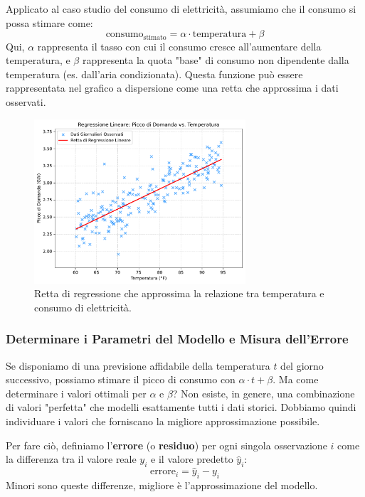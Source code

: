 \documentclass{article}
\begin{document}
Applicato al caso studio del consumo di elettricità, assumiamo che il consumo si possa stimare come:
$$ \text{consumo}_{\text{stimato}} = \alpha \cdot \text{temperatura} + \beta $$
Qui, $\alpha$ rappresenta il tasso con cui il consumo cresce all'aumentare della temperatura, e $\beta$ rappresenta la quota "base" di consumo non dipendente dalla temperatura (es. dall'aria condizionata).  Questa funzione può essere rappresentata nel grafico a dispersione come una retta che approssima i dati osservati.

\begin{figure}[H]
    \centering
    \includegraphics[width=0.7\textwidth]{images/electricity_scatter_with_line.pdf}
    \caption{Retta di regressione che approssima la relazione tra temperatura e consumo di elettricità.}
    \label{fig:electricity_scatter_line}
\end{figure}

\subsubsection{Determinare i Parametri del Modello e Misura dell'Errore}
Se disponiamo di una previsione affidabile della temperatura $t$ del giorno successivo, possiamo stimare il picco di consumo con $\alpha \cdot t + \beta$. Ma come determinare i valori ottimali per $\alpha$ e $\beta$?
Non esiste, in genere, una combinazione di valori "perfetta" che modelli esattamente tutti i dati storici.  Dobbiamo quindi individuare i valori che forniscano la migliore approssimazione possibile.

Per fare ciò, definiamo l'\textbf{errore} (o \textbf{residuo}) per ogni singola osservazione $i$ come la differenza tra il valore reale $y_i$ e il valore predetto $\hat{y}_i$:
$$ \text{errore}_i = \hat{y}_i - y_i $$
Minori sono queste differenze, migliore è l'approssimazione del modello.
\end{document}
